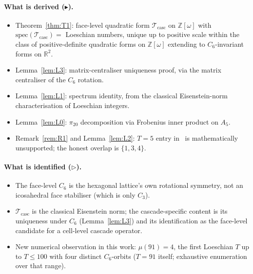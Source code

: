\documentclass[12pt]{article}
\newcommand{\Tcasc}{\mathcal{T}_{\mathrm{casc}}}
\newcommand{\Zom}{\mathbb{Z}[\omega]}
\begin{document}
\paragraph{What is derived ($\blacktriangleright$).}
\begin{itemize}
\item Theorem~\ref{thm:T1}: face-level quadratic form $\Tcasc$ on
$\Zom$ with $\mathrm{spec}(\Tcasc) = $ Loeschian numbers, unique up
to positive scale within the class of positive-definite quadratic
forms on $\Zom$ extending to $C_6$-invariant forms on $\mathbb{R}^2$.
\item Lemma~\ref{lem:L3}: matrix-centraliser uniqueness proof, via
the matrix centraliser of the $C_6$ rotation.
\item Lemma~\ref{lem:L1}: spectrum identity, from the classical
Eisenstein-norm characterisation of Loeschian integers.
\item Lemma~\ref{lem:L0}: $\pi_{20}$ decomposition via Frobenius
inner product on $A_5$.
\item Remark~\ref{rem:R1} and Lemma~\ref{lem:L2}: $T = 5$ entry
in~\cite[\S B3.2]{CascadeBio} is mathematically unsupported;
the honest overlap is $\{1, 3, 4\}$.
\end{itemize}

\paragraph{What is identified ($\triangleright$).}
\begin{itemize}
\item The face-level $C_6$ is the hexagonal lattice's own rotational
symmetry, not an icosahedral face stabiliser (which is only $C_3$).
\item $\Tcasc$ is the classical Eisenstein norm; the cascade-specific
content is its uniqueness under $C_6$ (Lemma~\ref{lem:L3}) and its
identification as the face-level candidate for a cell-level cascade
operator.
\item New numerical observation in this work: $\mu(91) = 4$, the
first Loeschian $T$ up to $T \le 100$ with four distinct
$C_6$-orbits ($T = 91$ itself; exhaustive enumeration over that
range).
\end{itemize}
\end{document}

